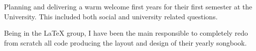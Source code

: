 
Planning and delivering a warm welcome first years for their first semester at the University. This
included both social and university related questions.

\medskip

Being in the LaTeX group, I have been the main responsible to completely redo from scratch all code
producing the layout and design of their yearly songbook.
